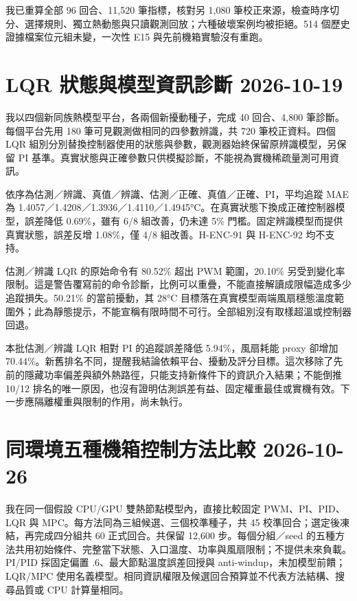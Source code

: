 \documentclass[12pt,a4paper]{article}
\begin{document}
我已重算全部 96 回合、11,520 筆指標，核對另 1,080 筆校正來源，檢查時序切分、選擇規則、獨立熱動態與只讀觀測回放；六種破壞案例均被拒絕。514 個歷史證據檔案位元組未變，一次性 E15 與先前機箱實驗沒有重跑。


\section*{LQR 狀態與模型資訊診斷 2026-10-19}

我以四個新同族熱模型平台，各兩個新擾動種子，完成 40 回合、4,800 筆診斷。每個平台先用 180 筆可見觀測做相同的四參數辨識，共 720 筆校正資料。四個 LQR 組別分別替換控制器使用的狀態與參數，觀測器始終保留原辨識模型，另保留 PI 基準。真實狀態與正確參數只供模擬診斷，不能視為實機稀疏量測可用資訊。


依序為估測／辨識、真值／辨識、估測／正確、真值／正確、PI，平均追蹤 MAE 為 1.4057／1.4208／1.3936／1.4110／1.4945°C。在真實狀態下換成正確控制器模型，誤差降低 0.69\%，雖有 6/8 組改善，仍未達 5\% 門檻。固定辨識模型而提供真實狀態，誤差反增 1.08\%，僅 4/8 組改善。H-ENC-91 與 H-ENC-92 均不支持。


估測／辨識 LQR 的原始命令有 80.52\% 超出 PWM 範圍，20.10\% 另受到變化率限制。這是警告覆寫前的命令診斷，比例可以重疊，不能直接解讀成限幅造成多少追蹤損失。50.21\% 的當前擾動，其 28°C 目標落在真實模型兩端風扇穩態溫度範圍外；此為靜態提示，不能宣稱有限時間不可行。全部組別沒有取樣超溫或控制器回退。


本批估測／辨識 LQR 相對 PI 的追蹤誤差降低 5.94\%，風扇耗能 proxy 卻增加 70.44\%。新舊排名不同，提醒我結論依賴平台、擾動及評分目標。這次移除了先前的隱藏功率偏差與額外熱路徑，只能支持新條件下的資訊介入結果；不能倒推 10/12 排名的唯一原因，也沒有證明估測誤差有益、固定權重最佳或實機有效。下一步應隔離權重與限制的作用，尚未執行。


\section*{同環境五種機箱控制方法比較 2026-10-26}

我在同一個假設 CPU/GPU 雙熱節點模型內，直接比較固定 PWM、PI、PID、LQR 與 MPC。每方法同為三組候選、三個校準種子，共 45 校準回合；選定後凍結，再完成四分組共 60 正式回合。共保留 12,600 步。每個分組／seed 的五種方法共用初始條件、完整當下狀態、入口溫度、功率與風扇限制；不提供未來負載。PI/PID 採固定偏置 .6、最大節點溫度誤差回授與 anti-windup，未加模型前饋；LQR/MPC 使用名義模型。相同資訊權限及候選回合預算並不代表方法結構、搜尋品質或 CPU 計算量相同。
\end{document}
